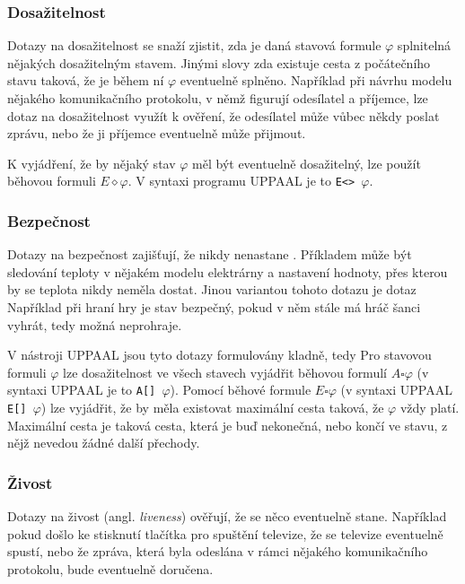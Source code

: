 \subsubsection{Dosažitelnost}
Dotazy na dosažitelnost se snaží zjistit, zda je daná stavová formule $\varphi$ splnitelná nějakých dosažitelným stavem. Jinými slovy zda existuje cesta z počátečního stavu taková, že je během ní $\varphi$ eventuelně splněno. Například při návrhu modelu nějakého komunikačního protokolu, v němž figurují odesílatel a příjemce, lze dotaz na dosažitelnost využít k ověření, že odesílatel může vůbec někdy poslat zprávu, nebo že ji příjemce eventuelně může přijmout.

K vyjádření, že by nějaký stav $\varphi$ měl být eventuelně dosažitelný, lze použít běhovou formuli $E \diamond \varphi$. V syntaxi programu UPPAAL je to \texttt{E<> $\varphi$}.

\subsubsection{Bezpečnost}
Dotazy na bezpečnost zajišťují, že nikdy nenastane . Příkladem může být sledování teploty v nějakém modelu elektrárny a nastavení hodnoty, přes kterou by se teplota nikdy neměla dostat. Jinou variantou tohoto dotazu je dotaz  Například při hraní hry je stav bezpečný, pokud v něm stále má hráč šanci vyhrát, tedy možná neprohraje.

V nástroji UPPAAL jsou tyto dotazy formulovány kladně, tedy  Pro stavovou formuli $\varphi$ lze dosažitelnost ve všech stavech vyjádřit běhovou formulí $A \square \varphi$ (v syntaxi UPPAAL je to \texttt{A[] $\varphi$}). Pomocí běhové formule $E \square \varphi$ (v syntaxi UPPAAL \texttt{E[] $\varphi$}) lze vyjádřit, že by měla existovat maximální cesta taková, že $\varphi$ vždy platí. Maximální cesta je taková cesta, která je buď nekonečná, nebo končí ve stavu, z nějž nevedou žádné další přechody.

\subsubsection{Živost}
Dotazy na živost (angl. \textit{liveness}) ověřují, že se něco eventuelně stane. Například pokud došlo ke stisknutí tlačítka pro spuštění televize, že se televize eventuelně spustí, nebo že zpráva, která byla odeslána v rámci nějakého komunikačního protokolu, bude eventuelně doručena.

